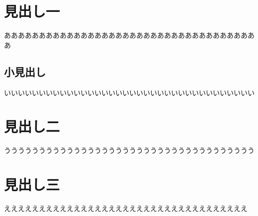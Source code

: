 \documentclass[pdflatex,tate]{jlreq}
\begin{document}
\section{見出し一}
あああああああああああああああああああああああああああああああああああああ
\subsection{小見出し}
いいいいいいいいいいいいいいいいいいいいいいいいいいいいいいいいいいいい
\section{見出し二}
うううううううううううううううううううううううううううううううううううう
\clearpage
\tableofcontents
{}
\clearpage
\section{見出し三}
えええええええええええええええええええええええええええええええええええ
\end{document}
